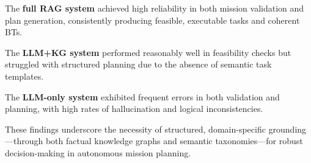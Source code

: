     The \textbf{full RAG system} achieved high reliability in both mission validation and plan generation, consistently producing feasible, executable tasks and coherent BTs.

    The \textbf{LLM+KG system} performed reasonably well in feasibility checks but struggled with structured planning due to the absence of semantic task templates.

    The \textbf{LLM-only system} exhibited frequent errors in both validation and planning, with high rates of hallucination and logical inconsistencies.

These findings underscore the necessity of structured, domain-specific grounding—through both factual knowledge graphs and semantic taxonomies—for robust decision-making in autonomous mission planning.

